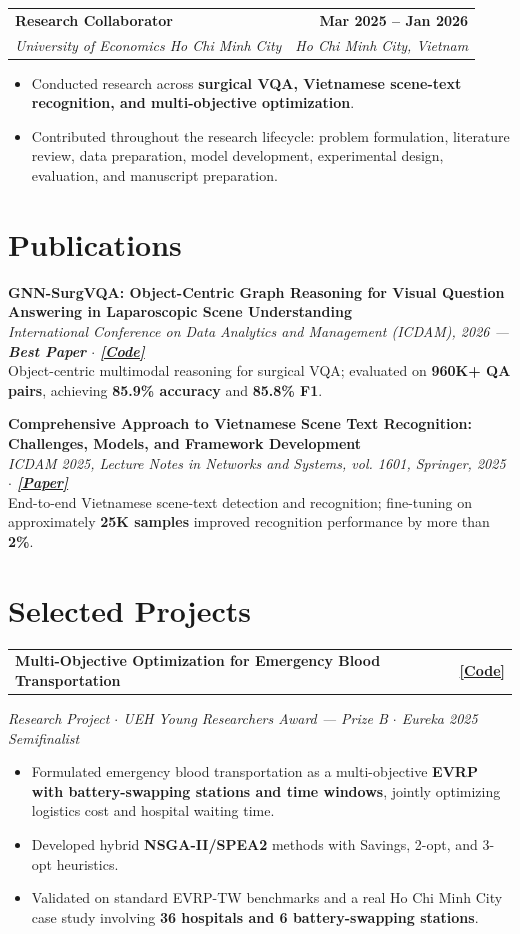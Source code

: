 \documentclass[a4paper,10pt]{article}
\makeatletter
\newcommand{\cvitem}{\itemsep0.85mm\parskip0pt\parsep0pt}
\newcommand{\bulletliststart}{\begin{itemize}[leftmargin=4.2mm,label=\raisebox{0.2ex}{\tiny$\bullet$},topsep=1.3mm] \cvitem}
\newcommand{\bulletlistend}{\end{itemize}\vspace{0.6mm}}
\newcommand{\experience}[4]{%
  \par\noindent
  \begin{tabularx}{\textwidth}{@{}Xr@{}}
    \textbf{#1} & \textbf{#2} \\
    \textit{#3} & \textit{#4}
  \end{tabularx}
  \par\vspace{0.5mm}
}
\newcommand{\publication}[3]{%
  \par\noindent
  \textbf{#1}\\[-0.2mm]
  \textit{#2}\\[-0.2mm]
  #3
  \par
}
\newcommand{\project}[2]{%
  \par\noindent
  \begin{tabularx}{\textwidth}{@{}Xr@{}}
    \textbf{#1} & #2
  \end{tabularx}
  \par\vspace{0.5mm}
}
\makeatother
\begin{document}
\experience
  {Research Collaborator}
  {Mar 2025 -- Jan 2026}
  {University of Economics Ho Chi Minh City}
  {Ho Chi Minh City, Vietnam}
\bulletliststart
  \item Conducted research across \textbf{surgical VQA, Vietnamese scene-text recognition, and multi-objective optimization}.
  \item Contributed throughout the research lifecycle: problem formulation, literature review, data preparation, model development, experimental design, evaluation, and manuscript preparation.
\bulletlistend

\newpage
\section{Publications}
\vspace{1.2mm}
\publication
  {GNN-SurgVQA: Object-Centric Graph Reasoning for Visual Question Answering in Laparoscopic Scene Understanding}
  {International Conference on Data Analytics and Management (ICDAM), 2026 --- \textbf{Best Paper} $\cdot$ \href{https://github.com/nmhongtram/gnn-surgical-understanding}{\textup{\textbf{[Code]}}}}
  {Object-centric multimodal reasoning for surgical VQA; evaluated on \textbf{960K+ QA pairs}, achieving \textbf{85.9\% accuracy} and \textbf{85.8\% F1}.}

\vspace{3mm}
\publication
  {Comprehensive Approach to Vietnamese Scene Text Recognition: Challenges, Models, and Framework Development}
  {ICDAM 2025, Lecture Notes in Networks and Systems, vol. 1601, Springer, 2025 $\cdot$ \href{https://link.springer.com/chapter/10.1007/978-3-032-03527-1_3}{\textup{\textbf{[Paper]}}}}
  {End-to-end Vietnamese scene-text detection and recognition; fine-tuning on approximately \textbf{25K samples} improved recognition performance by more than \textbf{2\%}.}

\section{Selected Projects}
\project
  {Multi-Objective Optimization for Emergency Blood Transportation}
  {\href{https://github.com/nmhongtram/blood-transport-optimization}{\textbf{[Code]}}}
\noindent\textit{Research Project $\cdot$ UEH Young Researchers Award --- Prize B $\cdot$ Eureka 2025 Semifinalist}
\bulletliststart
  \item Formulated emergency blood transportation as a multi-objective \textbf{EVRP with battery-swapping stations and time windows}, jointly optimizing logistics cost and hospital waiting time.
  \item Developed hybrid \textbf{NSGA-II/SPEA2} methods with Savings, 2-opt, and 3-opt heuristics.
  \item Validated on standard EVRP-TW benchmarks and a real Ho Chi Minh City case study involving \textbf{36 hospitals and 6 battery-swapping stations}.
\bulletlistend
\vspace{2.5mm}
\end{document}
